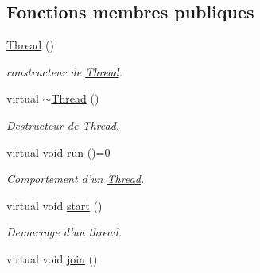 \subsection*{Fonctions membres publiques}
\begin{DoxyCompactItemize}
\item 
\hypertarget{classThread_a95c703fb8f2f27cb64f475a8c940864a}{
\hyperlink{classThread_a95c703fb8f2f27cb64f475a8c940864a}{Thread} ()}
\label{classThread_a95c703fb8f2f27cb64f475a8c940864a}

\begin{DoxyCompactList}\small\item\em constructeur de \hyperlink{classThread}{Thread}. \item\end{DoxyCompactList}\item 
\hypertarget{classThread_a37d9edd3a1a776cbc27dedff949c9726}{
virtual \hyperlink{classThread_a37d9edd3a1a776cbc27dedff949c9726}{$\sim$Thread} ()}
\label{classThread_a37d9edd3a1a776cbc27dedff949c9726}

\begin{DoxyCompactList}\small\item\em Destructeur de \hyperlink{classThread}{Thread}. \item\end{DoxyCompactList}\item 
\hypertarget{classThread_aae90dfabab3e1776cf01a26e7ee3a620}{
virtual void \hyperlink{classThread_aae90dfabab3e1776cf01a26e7ee3a620}{run} ()=0}
\label{classThread_aae90dfabab3e1776cf01a26e7ee3a620}

\begin{DoxyCompactList}\small\item\em Comportement d'un \hyperlink{classThread}{Thread}. \item\end{DoxyCompactList}\item 
\hypertarget{classThread_a1f53ee62bd30a7924186ef26150ce262}{
virtual void \hyperlink{classThread_a1f53ee62bd30a7924186ef26150ce262}{start} ()}
\label{classThread_a1f53ee62bd30a7924186ef26150ce262}

\begin{DoxyCompactList}\small\item\em Demarrage d'un thread. \item\end{DoxyCompactList}\item 
\hypertarget{classThread_a4d9d788e98388a3217831a9046709deb}{
virtual void \hyperlink{classThread_a4d9d788e98388a3217831a9046709deb}{join} ()}
\label{classThread_a4d9d788e98388a3217831a9046709deb}


\end{DoxyCompactItemize}
